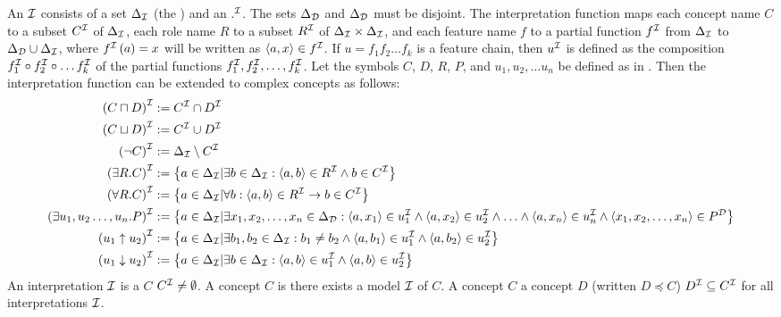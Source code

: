 \begin{defi}
An  $\mathcal{I}$ consists of a set $\Delta_{\mathcal{I}}$ (the ) and an  $.^{\mathcal{I}}$. The sets $\Delta_{\mathcal{D}}$ and $\Delta_{\mathcal{D}}$ must be disjoint. The interpretation function maps each concept name $C$ to a subset $C^{\mathcal{I}}$ of $\Delta_{\mathcal{I}}$, each role name $R$ to a subset $R^{\mathcal{I}}$ of $\Delta_{\mathcal{I}}\times\Delta_{\mathcal{I}}$, and each feature name $f$ to a partial function $f^{\mathcal{I}}$ from $\Delta_{\mathcal{I}}$ to $\Delta_{\mathcal{D}}\cup\Delta_{\mathcal{I}}$, where $f^{\mathcal{I}}\left(a\right)=x$ will be written as $\left\langle a,x\right\rangle\in f^{\mathcal{I}}$. If $u=f_1f_2\ldots f_k$ is a feature chain, then $u^{\mathcal{I}}$ is defined as the composition $f_1^{\mathcal{I}}\circ f_2^{\mathcal{I}}\circ\ldots f_k^{\mathcal{I}}$ of the partial functions $f_1^{\mathcal{I}},f_2^{\mathcal{I}},\ldots,f_k^{\mathcal{I}}$. Let the symbols $C$, $D$, $R$, $P$, and $u_1,u_2,\ldots u_n$ be defined as in . Then the interpretation function can be extended to complex concepts as 
follows:
\begin{align}
\left( C\sqcap D\right)^{\mathcal{I}}&:=C^{\mathcal{I}}\cap D^{\mathcal{I}}\\
\left( C\sqcup D\right)^{\mathcal{I}}&:=C^{\mathcal{I}}\cup D^{\mathcal{I}}\\
\left( \neg C\right)^{\mathcal{I}}&:=\Delta_{\mathcal{I}}\setminus C^{\mathcal{I}}\\
\left( \exists R.C\right)^{\mathcal{I}}&:=\left\{ a\in\Delta_{\mathcal{I}}|\exists b\in\Delta_{\mathcal{I}}:\left\langle a,b\right\rangle\in R^{\mathcal{I}}\wedge b\in C^{\mathcal{I}}\right\}\\
\left( \forall R.C\right)^{\mathcal{I}}&:=\left\{ a\in\Delta_{\mathcal{I}}|\forall b:\left\langle a,b\right\rangle\in R^{\mathcal{I}}\rightarrow b\in C^{\mathcal{I}}\right\}\\
\left( \exists u_1,u_2\ldots,u_n.P\right)^{\mathcal{I}}&:=\left\{ a\in\Delta_{\mathcal{I}}|\exists x_1,x_2,\ldots,x_n\in\Delta_{\mathcal{D}}:\left\langle a,x_1\right\rangle\in u_1^{\mathcal{I}}\wedge\left\langle a,x_2\right\rangle\in u_2^{\mathcal{I}}\wedge\ldots\wedge\left\langle a,x_n\right\rangle\in u_n^{\mathcal{I}}\wedge\left\langle x_1,x_2,\ldots,x_n\right\rangle\in P^{\mathcal{D}}\right\}\\
\left( u_1\uparrow u_2\right)^{\mathcal{I}}&:=\left\{ a\in\Delta_{\mathcal{I}}|\exists b_1,b_2\in\Delta_{\mathcal{I}}:b_1\neq b_2\wedge\left\langle a,b_1\right\rangle\in u_1^{\mathcal{I}}\wedge\left\langle a,b_2\right\rangle\in u_2^{\mathcal{I}}\right\}\\
\left( u_1\downarrow u_2\right)^{\mathcal{I}}&:=\left\{ a\in\Delta_{\mathcal{I}}|\exists b\in\Delta_{\mathcal{I}}:\left\langle a,b\right\rangle\in u_1^{\mathcal{I}}\wedge\left\langle a,b\right\rangle\in u_2^{\mathcal{I}}\right\}
\end{align}
An interpretation $\mathcal{I}$ is a  $C$ \iffTx{} $C^{\mathcal{I}}\neq\emptyset$. A concept $C$ is  \iffTx{} there exists a model $\mathcal{I}$ of $C$. A concept $C$  a concept $D$ (written $D\preceq C$) \iffTx{} $D^{\mathcal{I}}\subseteq C^{\mathcal{I}}$ for all interpretations $\mathcal{I}$.
\cite{conf/ijcai/Lutz99}
\end{defi}


